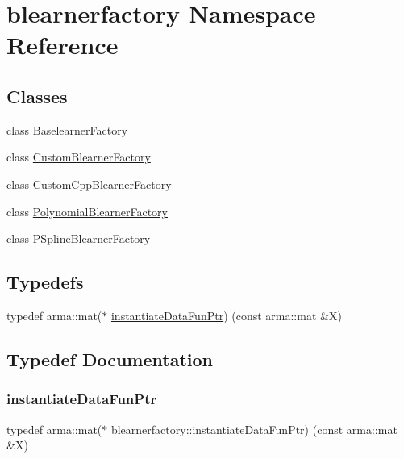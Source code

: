 \hypertarget{namespaceblearnerfactory}{}\section{blearnerfactory Namespace Reference}
\label{namespaceblearnerfactory}
\subsection*{Classes}
\begin{DoxyCompactItemize}
\item 
class \mbox{\hyperlink{classblearnerfactory_1_1_baselearner_factory}{Baselearner\+Factory}}
\item 
class \mbox{\hyperlink{classblearnerfactory_1_1_custom_blearner_factory}{Custom\+Blearner\+Factory}}
\item 
class \mbox{\hyperlink{classblearnerfactory_1_1_custom_cpp_blearner_factory}{Custom\+Cpp\+Blearner\+Factory}}
\item 
class \mbox{\hyperlink{classblearnerfactory_1_1_polynomial_blearner_factory}{Polynomial\+Blearner\+Factory}}
\item 
class \mbox{\hyperlink{classblearnerfactory_1_1_p_spline_blearner_factory}{P\+Spline\+Blearner\+Factory}}
\end{DoxyCompactItemize}
\subsection*{Typedefs}
\begin{DoxyCompactItemize}
\item 
typedef arma\+::mat($\ast$ \mbox{\hyperlink{namespaceblearnerfactory_a74e80c9723f4fa8866e09a04dfa3035b}{instantiate\+Data\+Fun\+Ptr}}) (const arma\+::mat \&X)
\end{DoxyCompactItemize}


\subsection{Typedef Documentation}
\mbox{\label{namespaceblearnerfactory_a74e80c9723f4fa8866e09a04dfa3035b}} 
\subsubsection{\texorpdfstring{instantiate\+Data\+Fun\+Ptr}{instantiateDataFunPtr}}
{\footnotesize\ttfamily typedef arma\+::mat($\ast$ blearnerfactory\+::instantiate\+Data\+Fun\+Ptr) (const arma\+::mat \&X)}

